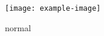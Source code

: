 \documentclass{article}
\begin{document}
\begin{figure}[t]
\texttt{[image: example-image]}
\caption{normal}
\end{figure}
\end{document}
